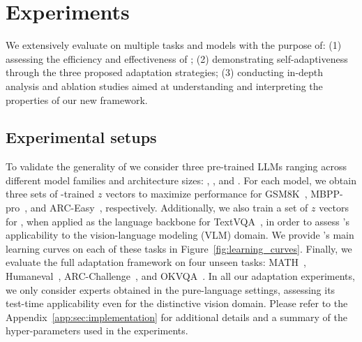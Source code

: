 \section{Experiments}
\label{sec:experiments}

\vspace{-2mm}

We extensively evaluate \implname on multiple tasks and models with the purpose of:
(1) assessing the efficiency and effectiveness of \svdacro;
(2) demonstrating self-adaptiveness through the three proposed adaptation strategies;
(3) conducting in-depth analysis and ablation studies aimed at understanding and interpreting the properties of our new framework.

\vspace{-2mm}
\subsection{Experimental setups}
\vspace{-1mm}

To validate the generality of \implname we consider three pre-trained LLMs ranging across different model families and architecture sizes: \llama, \mistral, and \llamaXL.
For each model, we obtain three sets of \svdacro-trained $z$ vectors to maximize performance for GSM8K~\citep{cobbe2021training},  MBPP-pro~\citep{austin2021program}, and ARC-Easy~\citep{clark2018think}, respectively.
Additionally, we also train a set of $z$ vectors for \llama, when applied as the language backbone for TextVQA~\citep{singh2019towards}, in order to assess \svdacro's applicability to the vision-language modeling (VLM) domain.
We provide \svdacro's main learning curves on each of these tasks in Figure~\ref{fig:learning_curves}. 
Finally, we evaluate the full \implname adaptation framework on four unseen tasks: MATH~\citep{hendrycks2021measuring}, Humaneval~\citep{chen2021evaluating}, ARC-Challenge~\citep{clark2018think}, and OKVQA~\citep{marino2019ok}. In all our adaptation experiments, we only consider experts obtained in the pure-language settings, assessing its test-time applicability even for the distinctive vision domain. 
Please refer to the Appendix~\ref{app:sec:implementation} for additional details and a summary of the hyper-parameters used in the experiments.

